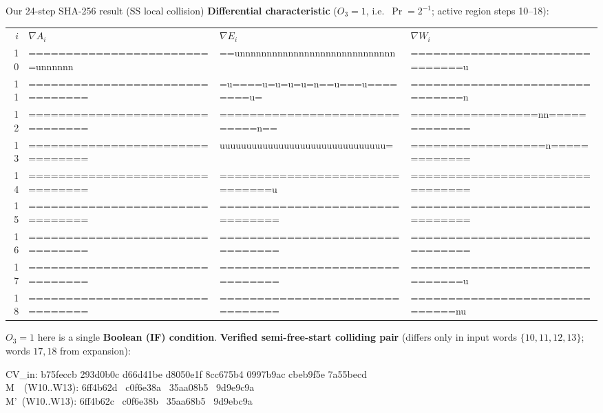 \documentclass[aspectratio=169,9pt]{beamer}
\newcommand{\key}[1]{\textcolor{key}{\textbf{#1}}}
\newcommand{\hot}[1]{\textcolor{hot}{#1}}
\begin{document}
\begin{frame}{Our 24-step SHA-256 result (SS local collision)}
\textbf{Differential characteristic} ($O_3=1$, i.e.\ $\Pr=2^{-1}$; active region steps 10--18):
\begin{block}{}
\centering\ttfamily\footnotesize
\begin{tabular}{r l l l}
$i$ & $\nabla A_i$ & $\nabla E_i$ & $\nabla W_i$\\
10 & =========================unnnnnn & ==unnnnnnnnnnnnnnnnnnnnnnnnnnnnn & ===============================u\\
11 & ================================ & =u====u=u=u=u=n==u===u========u= & ===============================n\\
12 & ================================ & =============================n== & =================nn=============\\
13 & ================================ & uuuuuuuuuuuuuuuuuuuuuuuuuuuuuuu= & ==================n=============\\
14 & ================================ & ===============================u & ================================\\
15 & ================================ & ================================ & ================================\\
16 & ================================ & ================================ & ================================\\
17 & ================================ & ================================ & ===============================u\\
18 & ================================ & ================================ & ==============================nu\\
\end{tabular}
\end{block}
\small $O_3=1$ here is a single \key{Boolean (IF) condition}.
\textbf{Verified semi-free-start colliding pair} (differs only in input words $\{10,11,12,13\}$; words $17,18$ from expansion):
\begin{block}{}
\centering\ttfamily\small
CV\_in: b75feccb 293d0b0c d66d41be d8050e1f 8cc675b4 0997b9ac cbeb9f5e 7a55becd\\[3pt]
M\ \ (W10..W13): 6ff4b62\hot{d} \ c0f6e38\hot{a} \ 35aa\hot{0}8b5 \ 9d9e\hot{9}c9a\\[2pt]
M'\ (W10..W13): 6ff4b62\hot{c} \ c0f6e38\hot{b} \ 35aa\hot{6}8b5 \ 9d9e\hot{b}c9a
\end{block}
\end{frame}
\end{document}
